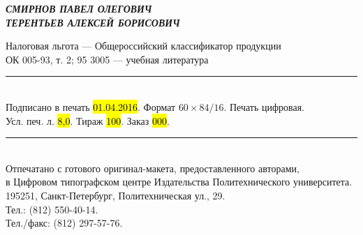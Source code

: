 \thispagestyle{title}

\null\nointerlineskip\vfill

\begin{center}
\textbf{\textit{СМИРНОВ ПАВЕЛ ОЛЕГОВИЧ\\ ТЕРЕНТЬЕВ АЛЕКСЕЙ БОРИСОВИЧ}}
\end{center}

\vfill\vfill

\makeatletter
\begin{center}
{\large\textbf{\MakeUppercase{\@title}}}

\vskip1cm

\textbf{\textit{\@subtitle}}
\end{center}
\makeatother

\vfill\vfill\vfill

\begin{center}
Налоговая льгота — Общероссийский классификатор продукции\\
ОК 005-93, т. 2; 95 3005 — учебная литература

\rule{\textwidth}{1pt}\\[.5em]
Подписано в печать \hl{01.04.2016}. Формат $60\times84/16$. Печать цифровая.\\
Усл. печ. л. \hl{8,0}. Тираж \hl{100}. Заказ \hl{000}.\\
\rule{\textwidth}{1pt}\\[.5em]

Отпечатано с готового оригинал-макета, предоставленного авторами,\\
в Цифровом типографском центре Издательства Политехнического университета.\\
195251, Санкт-Петербург, Политехническая ул., 29.\\
Тел.: (812) 550-40-14.\\
Тел./факс: (812) 297-57-76.
\end{center}
